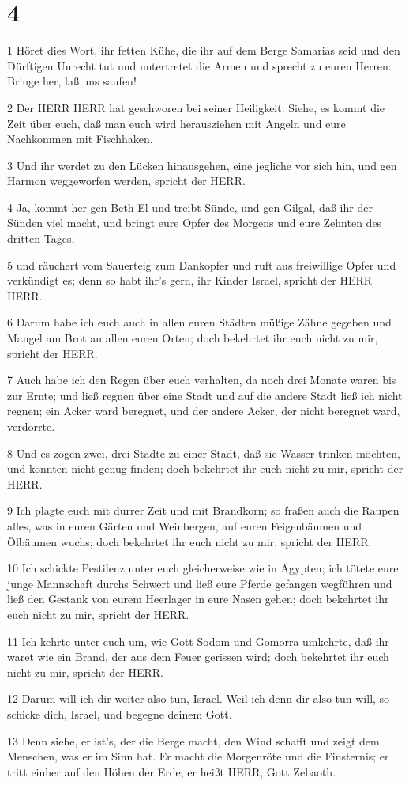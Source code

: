 \chapter{4}

\par 1 Höret dies Wort, ihr fetten Kühe, die ihr auf dem Berge Samarias seid und den Dürftigen Unrecht tut und untertretet die Armen und sprecht zu euren Herren: Bringe her, laß uns saufen!
\par 2 Der HERR HERR hat geschworen bei seiner Heiligkeit: Siehe, es kommt die Zeit über euch, daß man euch wird herausziehen mit Angeln und eure Nachkommen mit Fischhaken.
\par 3 Und ihr werdet zu den Lücken hinausgehen, eine jegliche vor sich hin, und gen Harmon weggeworfen werden, spricht der HERR.
\par 4 Ja, kommt her gen Beth-El und treibt Sünde, und gen Gilgal, daß ihr der Sünden viel macht, und bringt eure Opfer des Morgens und eure Zehnten des dritten Tages,
\par 5 und räuchert vom Sauerteig zum Dankopfer und ruft aus freiwillige Opfer und verkündigt es; denn so habt ihr's gern, ihr Kinder Israel, spricht der HERR HERR.
\par 6 Darum habe ich euch auch in allen euren Städten müßige Zähne gegeben und Mangel am Brot an allen euren Orten; doch bekehrtet ihr euch nicht zu mir, spricht der HERR.
\par 7 Auch habe ich den Regen über euch verhalten, da noch drei Monate waren bis zur Ernte; und ließ regnen über eine Stadt und auf die andere Stadt ließ ich nicht regnen; ein Acker ward beregnet, und der andere Acker, der nicht beregnet ward, verdorrte.
\par 8 Und es zogen zwei, drei Städte zu einer Stadt, daß sie Wasser trinken möchten, und konnten nicht genug finden; doch bekehrtet ihr euch nicht zu mir, spricht der HERR.
\par 9 Ich plagte euch mit dürrer Zeit und mit Brandkorn; so fraßen auch die Raupen alles, was in euren Gärten und Weinbergen, auf euren Feigenbäumen und Ölbäumen wuchs; doch bekehrtet ihr euch nicht zu mir, spricht der HERR.
\par 10 Ich schickte Pestilenz unter euch gleicherweise wie in Ägypten; ich tötete eure junge Mannschaft durchs Schwert und ließ eure Pferde gefangen wegführen und ließ den Gestank von eurem Heerlager in eure Nasen gehen; doch bekehrtet ihr euch nicht zu mir, spricht der HERR.
\par 11 Ich kehrte unter euch um, wie Gott Sodom und Gomorra umkehrte, daß ihr waret wie ein Brand, der aus dem Feuer gerissen wird; doch bekehrtet ihr euch nicht zu mir, spricht der HERR.
\par 12 Darum will ich dir weiter also tun, Israel. Weil ich denn dir also tun will, so schicke dich, Israel, und begegne deinem Gott.
\par 13 Denn siehe, er ist's, der die Berge macht, den Wind schafft und zeigt dem Menschen, was er im Sinn hat. Er macht die Morgenröte und die Finsternis; er tritt einher auf den Höhen der Erde, er heißt HERR, Gott Zebaoth.

